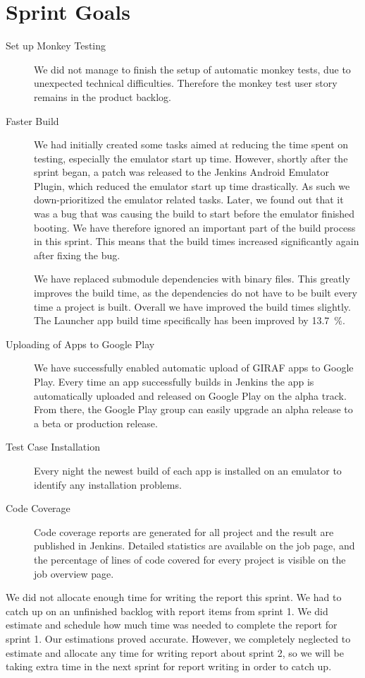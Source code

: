 \section{Sprint Goals}\label{sec:s2_goals}
\begin{description}
    \item[Set up Monkey Testing] We did not manage to finish the setup of automatic monkey tests, due to unexpected technical difficulties. Therefore the monkey test user story remains in the product backlog.
    \item[Faster Build] We had initially created some tasks aimed at reducing the time spent on testing, especially the emulator start up time. However, shortly after the sprint began, a patch was released to the Jenkins Android Emulator Plugin, which reduced the emulator start up time drastically. As such we down-prioritized the emulator related tasks. Later, we found out that it was a bug that was causing the build to start before the emulator finished booting. We have therefore ignored an important part of the build process in this sprint. This means that the build times increased significantly again after fixing the bug.

    We have replaced submodule dependencies with binary files. This greatly improves the build time, as the dependencies do not have to be built every time a project is built. Overall we have improved the build times slightly. The Launcher app build time specifically has been improved by \SI{13.7}{\percent}.
    \item[Uploading of Apps to Google Play] We have successfully enabled automatic upload of GIRAF apps to Google Play. Every time an app successfully builds in Jenkins the app is automatically uploaded and released on Google Play on the alpha track. From there, the Google Play group can easily upgrade an alpha release to a beta or production release.
    \item[Test Case Installation] Every night the newest build of each app is installed on an emulator to identify any installation problems.
    \item[Code Coverage] Code coverage reports are generated for all project and the result are published in Jenkins. Detailed statistics are available on the job page, and the percentage of lines of code covered for every project is visible on the job overview page.
\end{description}

We did not allocate enough time for writing the report this sprint. We had to catch up on an unfinished backlog with report items from sprint 1. We did estimate and schedule how much time was needed to complete the report for sprint 1. Our estimations proved accurate. However, we completely neglected to estimate and allocate any time for writing report about sprint 2, so we will be taking extra time in the next sprint for report writing in order to catch up.


